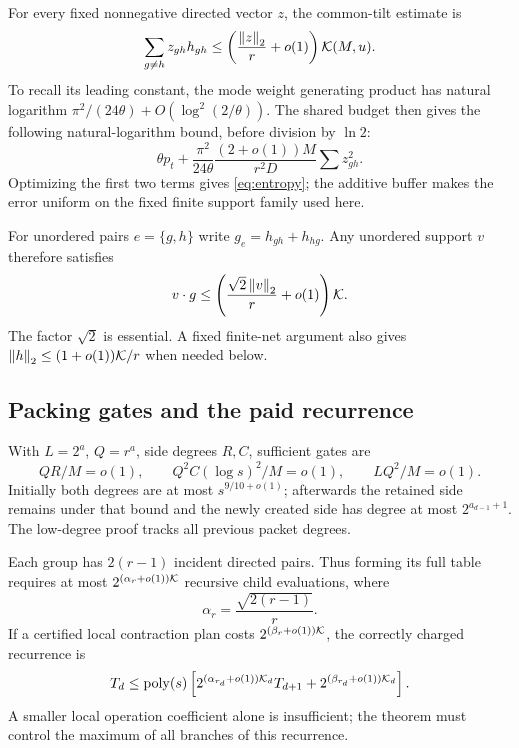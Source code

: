 For every fixed nonnegative directed vector $z$, the common-tilt estimate is
\begin{equation}\label{eq:entropy}
 \sum_{g\ne h}z_{gh}h_{gh}
 \le \left(\frac{\left\|z\right\|_2}{r}+o(1)\right)\mathcal K(M,u).
\end{equation}
To recall its leading constant, the mode weight generating product has
natural logarithm $\pi^2/(24\theta)+O(\log^2(2/\theta))$.
The shared budget then gives the following natural-logarithm bound,
before division by $\ln2$:
\[
 \theta p_t+\frac{\pi^2}{24\theta}
        \frac{(2+o(1))M}{r^2D}\sum z_{gh}^2.
\]
Optimizing the first two terms gives \eqref{eq:entropy}; the additive buffer
makes the error uniform on the fixed finite support family used here.

For unordered pairs $e=\{g,h\}$ write $g_e=h_{gh}+h_{hg}$.
Any unordered support $v$ therefore satisfies
\begin{equation}\label{eq:undirected-entropy}
 v\cdot g\le\left(\frac{\sqrt2\left\|v\right\|_2}{r}+o(1)\right)\mathcal K.
\end{equation}
The factor $\sqrt2$ is essential. A fixed finite-net argument also gives
$\left\|h\right\|_2\le(1+o(1))\mathcal K/r$ when needed below.

\subsection{Packing gates and the paid recurrence}

With $L=2^a$, $Q=r^a$, side degrees $R,C$, sufficient gates are
\begin{equation}\label{eq:gates}
 QR/M=o(1),\qquad Q^2C(\log s)^2/M=o(1),\qquad LQ^2/M=o(1).
\end{equation}
Initially both degrees are at most $s^{9/10+o(1)}$; afterwards the retained
side remains under that bound and the newly created side has degree at most
$2^{a_{d-1}+1}$. The low-degree proof tracks all previous packet degrees.

Each group has $2(r-1)$ incident directed pairs. Thus forming its full table
requires at most $2^{(\alpha_r+o(1))\mathcal K}$ recursive child evaluations, where
\[
 \alpha_r=\frac{\sqrt{2(r-1)}}r.
\]
If a certified local contraction plan costs $2^{(\beta_r+o(1))\mathcal K}$,
the correctly charged recurrence is
\begin{equation}\label{eq:recurrence}
 T_d\le\operatorname{poly}(s)\left[
    2^{(\alpha_{r_d}+o(1))\mathcal K_d}T_{d+1}
    +2^{(\beta_{r_d}+o(1))\mathcal K_d}\right].
\end{equation}
A smaller local operation coefficient alone is insufficient; the theorem
must control the maximum of all branches of this recurrence.

